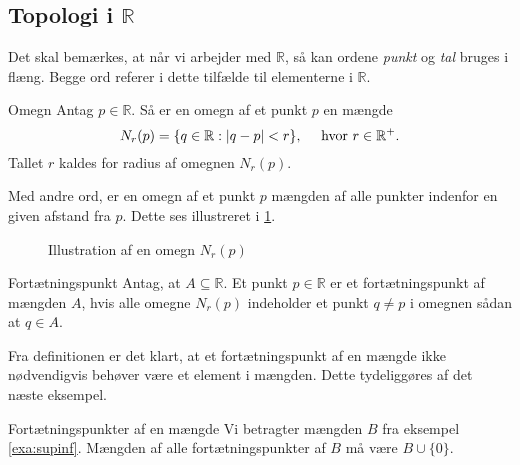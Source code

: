 \subsection{Topologi i $\mathbb{R}$}%
  \label{sub:Topologi i R}
Det skal bemærkes, at når vi arbejder med $\mathbb{R}$, så kan ordene \textit{punkt} og \textit{tal} bruges i flæng.
Begge ord referer i dette tilfælde til elementerne i $\mathbb{R}$.
  
\begin{definition}[label=def:omegn]{Omegn}{}
  Antag $p \in \mathbb{R}$. 
  Så er en omegn af et punkt $p$ en mængde 
  \[
  N_r(p)=\{ q \in \mathbb{R}:\abs{q-p} < r \}, \quad \text{ hvor }r \in \mathbb{R}^+. 
  \] 
  Tallet $r$ kaldes for radius af omegnen $N_r(p)$. 
\end{definition}
Med andre ord, er en omegn af et punkt $p$ mængden af alle punkter indenfor en given afstand fra $p$.
Dette ses illustreret i \cref{fig:omegn}.
\begin{figure}[H]
\begin{center}
\end{center}
  \caption{Illustration af en omegn $N_r(p)$}
\label{fig:omegn}
\end{figure}

\begin{definition}[label=def:fortætningspunkt]{Fortætningspunkt}{}
  Antag, at $A \subseteq \mathbb{R}$.
  Et punkt $p \in \mathbb{R}$ er et fortætningspunkt af mængden $A$, hvis alle omegne $N_r(p)$ indeholder et punkt $q \neq p$ i omegnen sådan at $q \in A$. 
\end{definition}

Fra definitionen er det klart, at et fortætningspunkt af en mængde ikke nødvendigvis behøver være et element i mængden.
Dette tydeliggøres af det næste eksempel.

\begin{example}[label=exa:]{Fortætningspunkter af en mængde}{}
  Vi betragter mængden $B$ fra eksempel \ref{exa:supinf}. 
  Mængden af alle fortætningspunkter af $B$ må være $B \cup \{ 0 \} $. 
\end{example}



